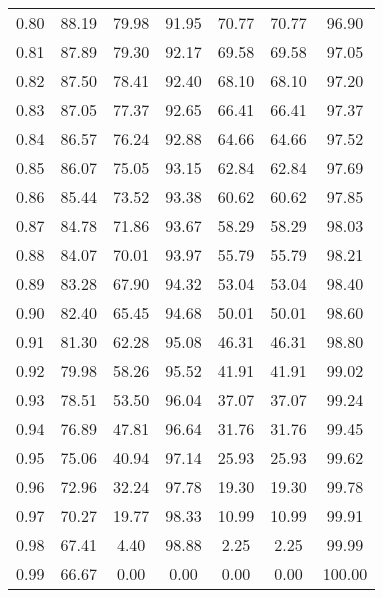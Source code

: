 \begin{tabular}{|c|c|c|c|c|c|c|}
      0.80 &     88.19 &     79.98 &      91.95 &   70.77 &      70.77 &         96.90 \\
      0.81 &     87.89 &     79.30 &      92.17 &   69.58 &      69.58 &         97.05 \\
      0.82 &     87.50 &     78.41 &      92.40 &   68.10 &      68.10 &         97.20 \\
      0.83 &     87.05 &     77.37 &      92.65 &   66.41 &      66.41 &         97.37 \\
      0.84 &     86.57 &     76.24 &      92.88 &   64.66 &      64.66 &         97.52 \\
      0.85 &     86.07 &     75.05 &      93.15 &   62.84 &      62.84 &         97.69 \\
      0.86 &     85.44 &     73.52 &      93.38 &   60.62 &      60.62 &         97.85 \\
      0.87 &     84.78 &     71.86 &      93.67 &   58.29 &      58.29 &         98.03 \\
      0.88 &     84.07 &     70.01 &      93.97 &   55.79 &      55.79 &         98.21 \\
      0.89 &     83.28 &     67.90 &      94.32 &   53.04 &      53.04 &         98.40 \\
      0.90 &     82.40 &     65.45 &      94.68 &   50.01 &      50.01 &         98.60 \\
      0.91 &     81.30 &     62.28 &      95.08 &   46.31 &      46.31 &         98.80 \\
      0.92 &     79.98 &     58.26 &      95.52 &   41.91 &      41.91 &         99.02 \\
      0.93 &     78.51 &     53.50 &      96.04 &   37.07 &      37.07 &         99.24 \\
      0.94 &     76.89 &     47.81 &      96.64 &   31.76 &      31.76 &         99.45 \\
      0.95 &     75.06 &     40.94 &      97.14 &   25.93 &      25.93 &         99.62 \\
      0.96 &     72.96 &     32.24 &      97.78 &   19.30 &      19.30 &         99.78 \\
      0.97 &     70.27 &     19.77 &      98.33 &   10.99 &      10.99 &         99.91 \\
      0.98 &     67.41 &      4.40 &      98.88 &    2.25 &       2.25 &         99.99 \\
      0.99 &     66.67 &      0.00 &       0.00 &    0.00 &       0.00 &        100.00 \\
\bottomrule
\end{tabular}
